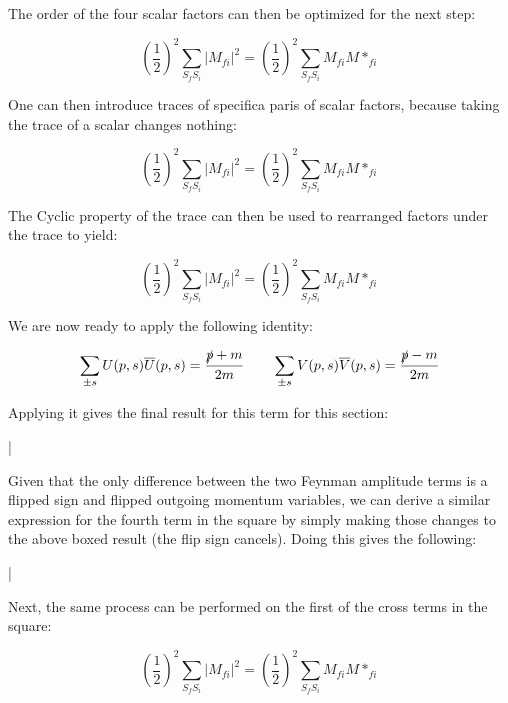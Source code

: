 \documentclass[a4]{article}
\begin{document}
    The order of the four scalar factors can then be optimized for the next step:

    \begin{equation}
        (\frac{1}{2})^2 \sum_{S_f S_i} |M_{f i}|^2 = (\frac{1}{2})^2 \sum_{S_f S_i} M_{fi} M*_{fi}
    \end{equation}

    One can then introduce traces of specifica paris of scalar factors, because taking the trace of a scalar changes nothing:

    \begin{equation}
        (\frac{1}{2})^2 \sum_{S_f S_i} |M_{f i}|^2 = (\frac{1}{2})^2 \sum_{S_f S_i} M_{fi} M*_{fi}
    \end{equation}

    The Cyclic property of the trace can then be used to rearranged factors under the trace to yield:

    \begin{equation}
        (\frac{1}{2})^2 \sum_{S_f S_i} |M_{f i}|^2 = (\frac{1}{2})^2 \sum_{S_f S_i} M_{fi} M*_{fi}
    \end{equation}

    We are now ready to apply the following identity:

    \begin{equation}
        \sum_{\pm s} U (p, s) \overline{U} (p, s) = \frac{\slashed{p} + m}{2m} \qquad \sum_{\pm s} V (p, s) \overline{V} (p, s) = \frac{\slashed{p} - m}{2m}
    \end{equation}

    Applying it gives the final result for this term for this section:

    \begin{framed}
        |
    \end{framed}

    Given that the only difference between the two Feynman amplitude terms is a flipped sign and flipped outgoing momentum variables, we can derive a similar expression for the fourth term in the square by simply making those changes
    to the above boxed result (the flip sign cancels). Doing this gives the following:

    \begin{framed}
        |
    \end{framed}

    Next, the same process can be performed on the first of the cross terms in the square:

    \begin{equation}
        (\frac{1}{2})^2 \sum_{S_f S_i} |M_{f i}|^2 = (\frac{1}{2})^2 \sum_{S_f S_i} M_{fi} M*_{fi}
    \end{equation}
\end{document}
